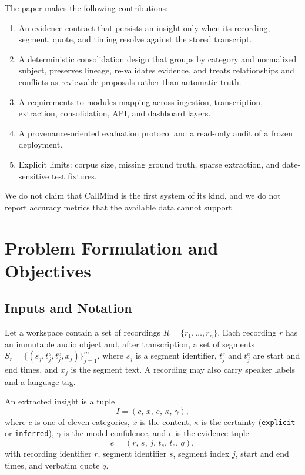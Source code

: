 \documentclass[conference,a4paper]{IEEEtran}
\newcommand{\code}[1]{\texttt{#1}}
\begin{document}
The paper makes the following contributions:
\begin{enumerate}
\item An evidence contract that persists an insight only when its recording, segment,
quote, and timing resolve against the stored transcript.
\item A deterministic consolidation design that groups by category and normalized subject,
preserves lineage, re-validates evidence, and treats relationships and conflicts as
reviewable proposals rather than automatic truth.
\item A requirements-to-modules mapping across ingestion, transcription, extraction,
consolidation, API, and dashboard layers.
\item A provenance-oriented evaluation protocol and a read-only audit of a frozen
deployment.
\item Explicit limits: corpus size, missing ground truth, sparse extraction, and
date-sensitive test fixtures.
\end{enumerate}

We do not claim that CallMind is the first system of its kind, and we do not report
accuracy metrics that the available data cannot support.

\section{Problem Formulation and Objectives}

\subsection{Inputs and Notation}

Let a workspace contain a set of recordings $R=\{r_1,\dots,r_n\}$. Each recording $r$ has
an immutable audio object and, after transcription, a set of segments
$S_r=\{(s_j,t^{s}_j,t^{e}_j,x_j)\}_{j=1}^{m}$, where $s_j$ is a segment identifier,
$t^{s}_j$ and $t^{e}_j$ are start and end times, and $x_j$ is the segment text. A
recording may also carry speaker labels and a language tag.

An extracted insight is a tuple
\begin{equation}
I=(c,\,x,\,e,\,\kappa,\,\gamma),
\end{equation}
where $c$ is one of eleven categories, $x$ is the content, $\kappa$ is the certainty
(\code{explicit} or \code{inferred}), $\gamma$ is the model confidence, and $e$ is the
evidence tuple
\begin{equation}
e=(r,\,s,\,j,\,t_s,\,t_e,\,q),
\end{equation}
with recording identifier $r$, segment identifier $s$, segment index $j$, start and end
times, and verbatim quote $q$.
\end{document}
